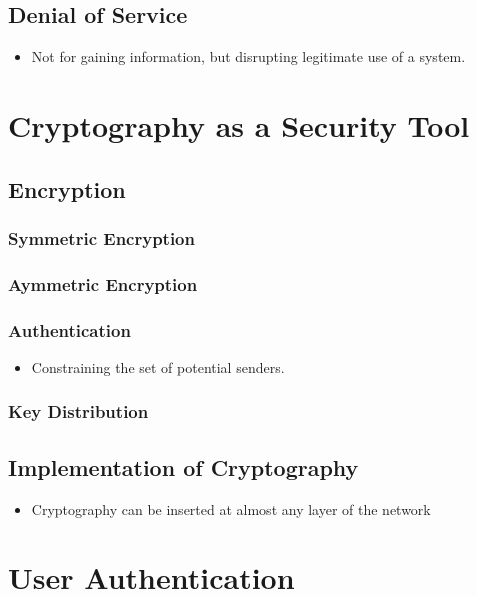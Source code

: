 \documentclass[10pt]{report}
\begin{document}
		\subsection{Denial of Service}
			\begin{itemize}
				\item Not for gaining information, but disrupting legitimate use of a system.
			\end{itemize}

	\section{Cryptography as a Security Tool}
		\subsection{Encryption}
			\subsubsection{Symmetric Encryption}
			\subsubsection{Aymmetric Encryption}
			\subsubsection{Authentication}
				\begin{itemize}
					\item Constraining the set of potential senders.
				\end{itemize}

			\subsubsection{Key Distribution}


		\subsection{Implementation of Cryptography}
			\begin{itemize}
				\item Cryptography can be inserted at almost any layer of the network
			\end{itemize}

	\section{User Authentication}
\end{document}
